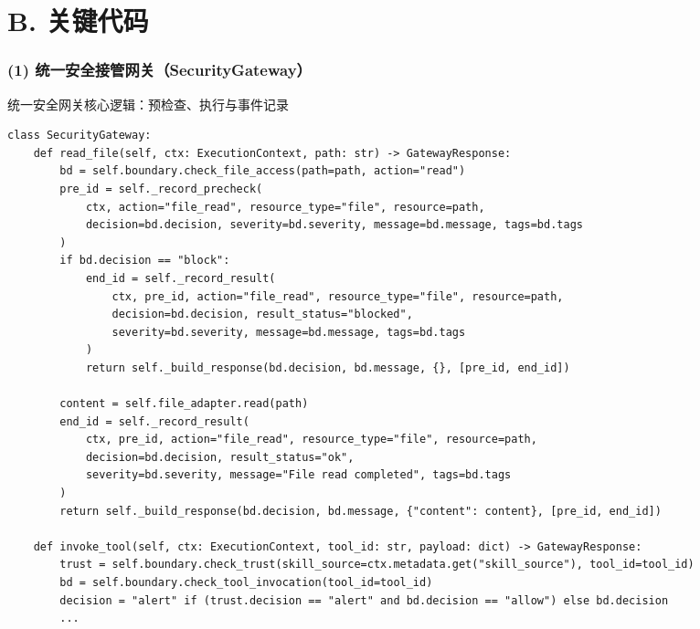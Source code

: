 \section*{B. 关键代码}
\label{sec:demo_core_code}

\setcounter{listing}{0}
\renewcommand{\thelisting}{B.\arabic{listing}}

\subsubsection{(1) 统一安全接管网关（SecurityGateway）}

\begin{listing}[htbp]
\caption{统一安全网关核心逻辑：预检查、执行与事件记录}
\label{lst:demo_gateway_core}
\begin{verbatim}
class SecurityGateway:
    def read_file(self, ctx: ExecutionContext, path: str) -> GatewayResponse:
        bd = self.boundary.check_file_access(path=path, action="read")
        pre_id = self._record_precheck(
            ctx, action="file_read", resource_type="file", resource=path,
            decision=bd.decision, severity=bd.severity, message=bd.message, tags=bd.tags
        )
        if bd.decision == "block":
            end_id = self._record_result(
                ctx, pre_id, action="file_read", resource_type="file", resource=path,
                decision=bd.decision, result_status="blocked",
                severity=bd.severity, message=bd.message, tags=bd.tags
            )
            return self._build_response(bd.decision, bd.message, {}, [pre_id, end_id])

        content = self.file_adapter.read(path)
        end_id = self._record_result(
            ctx, pre_id, action="file_read", resource_type="file", resource=path,
            decision=bd.decision, result_status="ok",
            severity=bd.severity, message="File read completed", tags=bd.tags
        )
        return self._build_response(bd.decision, bd.message, {"content": content}, [pre_id, end_id])

    def invoke_tool(self, ctx: ExecutionContext, tool_id: str, payload: dict) -> GatewayResponse:
        trust = self.boundary.check_trust(skill_source=ctx.metadata.get("skill_source"), tool_id=tool_id)
        bd = self.boundary.check_tool_invocation(tool_id=tool_id)
        decision = "alert" if (trust.decision == "alert" and bd.decision == "allow") else bd.decision
        ...
\end{verbatim}
\end{listing}

